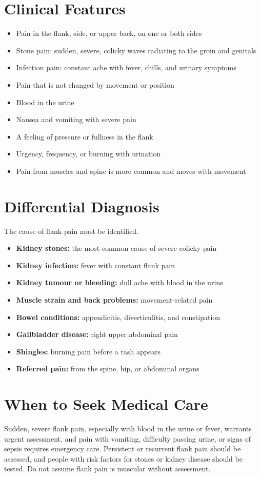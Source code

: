 \section*{Clinical Features}
\begin{itemize}
    \item Pain in the flank, side, or upper back, on one or both sides
    \item Stone pain: sudden, severe, colicky waves radiating to the groin and genitals
    \item Infection pain: constant ache with fever, chills, and urinary symptoms
    \item Pain that is not changed by movement or position
    \item Blood in the urine
    \item Nausea and vomiting with severe pain
    \item A feeling of pressure or fullness in the flank
    \item Urgency, frequency, or burning with urination
    \item Pain from muscles and spine is more common and moves with movement
\end{itemize}

\section*{Differential Diagnosis}
The cause of flank pain must be identified.
\begin{itemize}
    \item \textbf{Kidney stones:} the most common cause of severe colicky pain
    \item \textbf{Kidney infection:} fever with constant flank pain
    \item \textbf{Kidney tumour or bleeding:} dull ache with blood in the urine
    \item \textbf{Muscle strain and back problems:} movement-related pain
    \item \textbf{Bowel conditions:} appendicitis, diverticulitis, and constipation
    \item \textbf{Gallbladder disease:} right upper abdominal pain
    \item \textbf{Shingles:} burning pain before a rash appears
    \item \textbf{Referred pain:} from the spine, hip, or abdominal organs
\end{itemize}

\section*{When to Seek Medical Care}
Sudden, severe flank pain, especially with blood in the urine or fever, warrants urgent assessment, and pain with vomiting, difficulty passing urine, or signs of sepsis requires emergency care. Persistent or recurrent flank pain should be assessed, and people with risk factors for stones or kidney disease should be tested. Do not assume flank pain is muscular without assessment.


